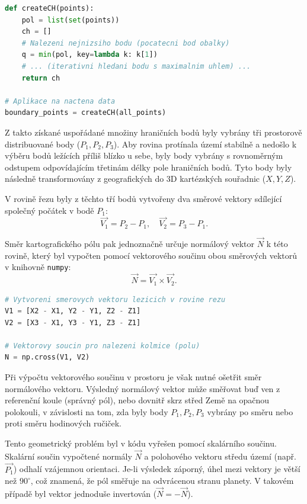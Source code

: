 \begin{lstlisting}[language=Python, caption=Redukce bodů pomocí konvexní obálky.]
def createCH(points):
    pol = list(set(points))
    ch = []
    # Nalezeni nejnizsiho bodu (pocatecni bod obalky)
    q = min(pol, key=lambda k: k[1])
    # ... (iterativni hledani bodu s maximalnim uhlem) ...
    return ch

# Aplikace na nactena data
boundary_points = createCH(all_points)
\end{lstlisting}

Z takto získané uspořádané množiny hraničních bodů byly vybrány tři prostorově distribuované body ($P_1, P_2, P_3$). Aby rovina protínala území stabilně a nedošlo k výběru bodů ležících příliš blízko u sebe, byly body vybrány s rovnoměrným odstupem odpovídajícím třetinám délky pole hraničních bodů. Tyto body byly následně transformovány z geografických do 3D kartézských souřadnic ($X, Y, Z$).

V rovině řezu byly z těchto tří bodů vytvořeny dva směrové vektory sdílející společný počátek v bodě $P_1$:
$$ \vec{V_1} = P_2 - P_1, \quad \vec{V_2} = P_3 - P_1. $$

Směr kartografického pólu pak jednoznačně určuje normálový vektor $\vec{N}$ k této rovině, který byl vypočten pomocí vektorového součinu obou směrových vektorů v knihovně \lstinline{numpy}:
$$ \vec{N} = \vec{V_1} \times \vec{V_2}. $$

\begin{lstlisting}[language=Python, caption=Tvorba roviny a výpočet normálového vektoru.]
# Vytvoreni smerovych vektoru lezicich v rovine rezu
V1 = [X2 - X1, Y2 - Y1, Z2 - Z1]
V2 = [X3 - X1, Y3 - Y1, Z3 - Z1]

# Vektorovy soucin pro nalezeni kolmice (polu)
N = np.cross(V1, V2)
\end{lstlisting}

Při výpočtu vektorového součinu v prostoru je však nutné ošetřit směr normálového vektoru. Výsledný normálový vektor může směřovat buď ven z referenční koule (správný pól), nebo dovnitř skrz střed Země na opačnou polokouli, v závislosti na tom, zda byly body $P_1, P_2, P_3$ vybrány po směru nebo proti směru hodinových ručiček. 

Tento geometrický problém byl v kódu vyřešen  pomocí skalárního součinu. Skalární součin vypočtené normály $\vec{N}$ a polohového vektoru středu území (např. $\vec{P_1}$) odhalí vzájemnou orientaci. Je-li výsledek záporný, úhel mezi vektory je větší než $90^\circ$, což znamená, že pól směřuje na odvrácenou stranu planety. V takovém případě byl vektor jednoduše invertován ($\vec{N} = -\vec{N}$).

